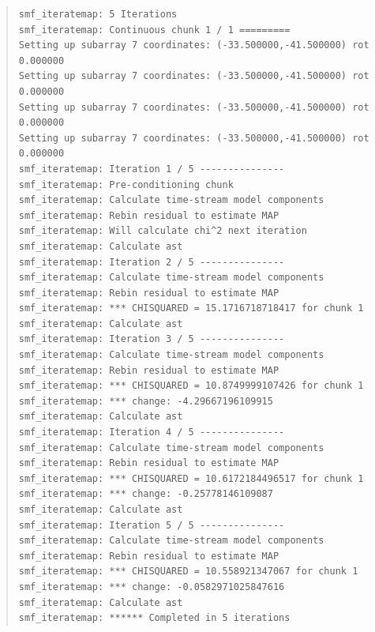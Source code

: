 \documentclass[twoside,11pt]{article}
\newenvironment{myquote}{\begin{quote}\begin{small}}{\end{small}\end{quote}}
\renewcommand{\_}{\texttt{\symbol{95}}}
\begin{document}
\begin{myquote}
\begin{verbatim}
smf_iteratemap: 5 Iterations
smf_iteratemap: Continuous chunk 1 / 1 =========
Setting up subarray 7 coordinates: (-33.500000,-41.500000) rot 0.000000
Setting up subarray 7 coordinates: (-33.500000,-41.500000) rot 0.000000
Setting up subarray 7 coordinates: (-33.500000,-41.500000) rot 0.000000
Setting up subarray 7 coordinates: (-33.500000,-41.500000) rot 0.000000
smf_iteratemap: Iteration 1 / 5 ---------------
smf_iteratemap: Pre-conditioning chunk
smf_iteratemap: Calculate time-stream model components
smf_iteratemap: Rebin residual to estimate MAP
smf_iteratemap: Will calculate chi^2 next iteration
smf_iteratemap: Calculate ast
smf_iteratemap: Iteration 2 / 5 ---------------
smf_iteratemap: Calculate time-stream model components
smf_iteratemap: Rebin residual to estimate MAP
smf_iteratemap: *** CHISQUARED = 15.1716718718417 for chunk 1
smf_iteratemap: Calculate ast
smf_iteratemap: Iteration 3 / 5 ---------------
smf_iteratemap: Calculate time-stream model components
smf_iteratemap: Rebin residual to estimate MAP
smf_iteratemap: *** CHISQUARED = 10.8749999107426 for chunk 1
smf_iteratemap: *** change: -4.29667196109915
smf_iteratemap: Calculate ast
smf_iteratemap: Iteration 4 / 5 ---------------
smf_iteratemap: Calculate time-stream model components
smf_iteratemap: Rebin residual to estimate MAP
smf_iteratemap: *** CHISQUARED = 10.6172184496517 for chunk 1
smf_iteratemap: *** change: -0.25778146109087
smf_iteratemap: Calculate ast
smf_iteratemap: Iteration 5 / 5 ---------------
smf_iteratemap: Calculate time-stream model components
smf_iteratemap: Rebin residual to estimate MAP
smf_iteratemap: *** CHISQUARED = 10.558921347067 for chunk 1
smf_iteratemap: *** change: -0.0582971025847616
smf_iteratemap: Calculate ast
smf_iteratemap: ****** Completed in 5 iterations
\end{verbatim}
\end{myquote}
\end{document}
